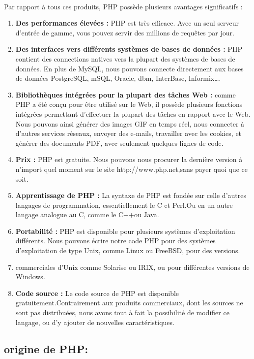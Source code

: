 \paragraph{}
Par rapport à tous ces produits, PHP possède plusieurs avantages
significatifs :
\begin{enumerate}
	\item \textbf{Des performances élevées :} PHP est très efficace. Avec un seul	serveur d’entrée de gamme, vous pouvez servir des millions de requêtes par jour.
	\item \textbf{Des interfaces vers différents systèmes de bases de données :} PHP	contient des connections natives vers la plupart des systèmes de	bases de données. En plus de MySQL, nous pouvons connecte directement aux bases de données PostgreSQL, mSQL, Oracle,
	dbm, InterBase, Informix….
	\item \textbf{Bibliothèques intégrées pour la plupart des tâches Web :} comme PHP a été conçu pour être utilisé sur le Web, il possède plusieurs fonctions intégrées permettant d’effectuer la plupart des tâches en rapport avec le Web. Nous pouvons ainsi générer des images GIF en temps réel, nous connecter à d’autres services réseaux, envoyer
	des e-mails, travailler avec les cookies, et générer des documents 	PDF, avec seulement quelques lignes de code.
	\item \textbf{Prix :} PHP est gratuite. Nous pouvons nous procurer la dernière version à n’import quel moment sur le site http://www.php.net,sans payer quoi que ce soit.
	\item \textbf{Apprentissage de PHP :} La syntaxe de PHP est fondée sur celle d’autres langages de programmation, essentiellement le C et Perl.Ou en un autre langage analogue au C, comme le C++ou Java.
	\item \textbf{Portabilité :} PHP est disponible pour plusieurs systèmes d’exploitation différents. Nous pouvons écrire notre code PHP pour des systèmes d’exploitation de type Unix, comme Linux ou
	FreeBSD, pour des versions.
	\item commerciales d’Unix comme Solarise ou IRIX, ou pour différentes
	versions de Windows.
	\item \textbf{Code source :} Le code source de PHP est disponible gratuitement.Contrairement aux produits commerciaux, dont les sources ne sont pas distribuées, nous avons tout à fait la possibilité de modifier ce	langage, ou d’y ajouter de nouvelles caractéristiques.
\end{enumerate}
\subsection{origine de PHP:} 
